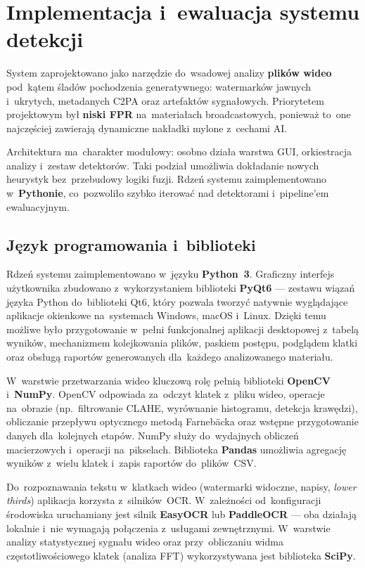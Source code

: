 \chapter{Implementacja i~ewaluacja systemu detekcji}

System zaprojektowano jako narzędzie do~wsadowej analizy \textbf{plików wideo}
pod~kątem śladów pochodzenia generatywnego: watermarków jawnych i~ukrytych,
metadanych C2PA oraz artefaktów sygnałowych. Priorytetem projektowym był
\textbf{niski FPR} na~materiałach broadcastowych, ponieważ to~one najczęściej
zawierają dynamiczne nakładki mylone z~cechami AI.

Architektura ma~charakter modułowy: osobno działa warstwa GUI, orkiestracja
analizy i~zestaw detektorów. Taki podział umożliwia dokładanie nowych heurystyk
bez~przebudowy logiki fuzji. Rdzeń systemu zaimplementowano w~\textbf{Pythonie},
co~pozwoliło szybko iterować nad detektorami i~pipeline'em ewaluacyjnym.

\section{Język programowania i~biblioteki}

Rdzeń systemu zaimplementowano w~języku \textbf{Python~3}.
Graficzny interfejs użytkownika zbudowano z~wykorzystaniem biblioteki \textbf{PyQt6} ---
zestawu wiązań języka Python do~biblioteki Qt6, który pozwala tworzyć
natywnie wyglądające aplikacje okienkowe na~systemach Windows, macOS i~Linux.
Dzięki temu możliwe było przygotowanie w~pełni funkcjonalnej aplikacji desktopowej
z~tabelą wyników, mechanizmem kolejkowania plików, paskiem postępu,
podglądem klatki oraz obsługą raportów generowanych dla~każdego
analizowanego materiału.

W~warstwie przetwarzania wideo kluczową rolę pełnią biblioteki \textbf{OpenCV}
i~\textbf{NumPy}. OpenCV odpowiada za~odczyt klatek z~pliku wideo, operacje na~obrazie
(np.\ filtrowanie CLAHE, wyrównanie histogramu, detekcja krawędzi),
obliczanie przepływu optycznego metodą Farnebäcka oraz wstępne przygotowanie
danych dla~kolejnych etapów. NumPy służy do~wydajnych obliczeń
macierzowych i~operacji na~pikselach. Biblioteka \textbf{Pandas} umożliwia
agregację wyników z~wielu klatek i~zapis raportów do~plików~CSV.

Do~rozpoznawania tekstu w~klatkach wideo (watermarki widoczne, napisy,
\textit{lower thirds}) aplikacja korzysta z~silników~OCR.
W~zależności od~konfiguracji środowiska uruchamiany jest silnik
\textbf{EasyOCR} lub \textbf{PaddleOCR} --- oba działają lokalnie
i~nie wymagają połączenia z~usługami zewnętrznymi.
W~warstwie analizy statystycznej sygnału wideo oraz przy~obliczaniu widma
częstotliwościowego klatek (analiza FFT) wykorzystywana jest biblioteka
\textbf{SciPy}.

